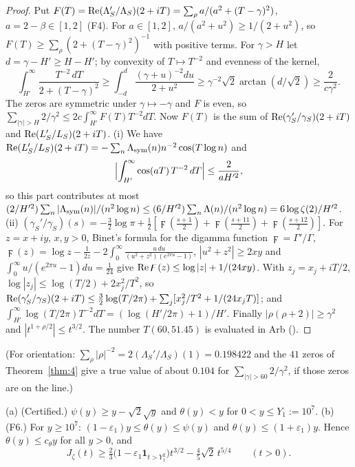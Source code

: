 \begin{proof}
Put $F(T)=\operatorname{Re}(\Lambda_S'/\Lambda_S)(2+iT)=\sum_\rho a/(a^2+(T-\gamma)^2)$, $a=2-\beta\in[1,2]$ (F4). For $a\in[1,2]$, $a/(a^2+u^2)\ge1/(2+u^2)$, so $F(T)\ge\sum_\rho(2+(T-\gamma)^2)^{-1}$ with positive terms. For $\gamma>H$ let $d=\gamma-H'\ge H-H'$; by convexity of $T\mapsto T^{-2}$ and evenness of the kernel,
\[
\int_{H'}^\infty\frac{T^{-2}\,dT}{2+(T-\gamma)^2}\ge\int_{-d}^d\frac{(\gamma+u)^{-2}du}{2+u^2}\ge\gamma^{-2}\sqrt2\arctan(d/\sqrt2)\ge\frac{2}{c\gamma^2}.
\]
The zeros are symmetric under $\gamma\mapsto-\gamma$ and $F$ is even, so $\sum_{|\gamma|>H}2/\gamma^2\le2c\int_{H'}^\infty F(T)T^{-2}dT$. Now $F(T)$ is the sum of $\operatorname{Re}(\gamma_S'/\gamma_S)(2+iT)$ and $\operatorname{Re}(L_S'/L_S)(2+iT)$. (i) We have $\operatorname{Re}(L_S'/L_S)(2+iT)=-\sum_n\Lambda_{\rm sym}(n)n^{-2}\cos(T\log n)$ and
\[
\Bigl|\int_{H'}^\infty\cos(aT)\,T^{-2}\,dT\Bigr|\le\frac2{aH'^2},
\]
so this part contributes at most $(2/H'^2)\sum_n|\Lambda_{\rm sym}(n)|/(n^2\log n)\le(6/H'^2)\sum_n\Lambda(n)/(n^2\log n)=6\log\zeta(2)/H'^2$. (ii) $(\gamma_S'/\gamma_S)(s)=-\frac32\log\pi+\frac12[\digamma(\frac{s+1}2)+\digamma(\frac{s+11}2)+\digamma(\frac{s+12}2)]$. For $z=x+iy$, $x,y>0$, Binet's formula for the digamma function $\digamma=\Gamma'/\Gamma$, $\digamma(z)=\log z-\frac1{2z}-2\int_0^\infty\frac{u\,du}{(u^2+z^2)(e^{2\pi u}-1)}$, $|u^2+z^2|\ge2xy$ and $\int_0^\infty u/(e^{2\pi u}-1)du=\frac1{24}$ give $\operatorname{Re}\digamma(z)\le\log|z|+1/(24xy)$. With $z_j=x_j+iT/2$, $\log|z_j|\le\log(T/2)+2x_j^2/T^2$, so $\operatorname{Re}(\gamma_S'/\gamma_S)(2+iT)\le\frac32\log(T/2\pi)+\sum_j[x_j^2/T^2+1/(24x_jT)]$; and $\int_{H'}^\infty\log(T/2\pi)T^{-2}dT=(\log(H'/2\pi)+1)/H'$. Finally $|\rho(\rho+2)|\ge\gamma^2$ and $|t^{1+\rho/2}|\le t^{3/2}$. The number $T(60,51.45)$ is evaluated in Arb ().
\end{proof}

(For orientation: $\sum_\rho|\rho|^{-2}=2(\Lambda_S'/\Lambda_S)(1)=0.198422$ and the $41$ zeros of Theorem~\ref{thm:4} give a true value of about $0.104$ for $\sum_{|\gamma|>60}2/\gamma^2$, if those zeros are on the line.)

\begin{lemma}\label{lem:psi}
\textup{(a)} (Certified.) $\psi(y)\ge y-\sqrt2\sqrt y$ and $\theta(y)<y$ for $0<y\le Y_1:=10^7$. \textup{(b)} (F6.) For $y\ge10^7$: $(1-\varepsilon_1)y\le\theta(y)\le\psi(y)$ and $\theta(y)\le(1+\varepsilon_1)y$. Hence $\theta(y)\le c_\theta y$ for all $y>0$, and
\[
J_\zeta(t)\ge\tfrac23\bigl(1-\varepsilon_1\mathbf 1_{t>Y_1^2}\bigr)t^{3/2}-\tfrac45\sqrt2\,t^{5/4}\qquad(t>0).
\]
\end{lemma}

